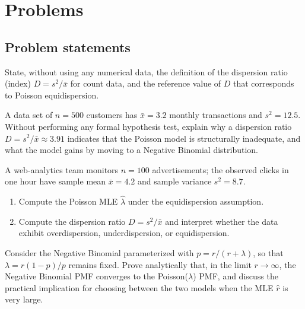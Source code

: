 \section*{Problems}

\subsection*{Problem statements}

\begin{problema}
	\label{prob:9b48fd0}
	State, without using any numerical data, the definition of the dispersion ratio (index) $D = s^2/\bar{x}$ for count data, and the reference value of $D$ that corresponds to Poisson equidispersion.
\end{problema}

\begin{problema}
	\label{prob:65ac238}
	A data set of $n=500$ customers has $\bar{x}=3.2$ monthly transactions and $s^2=12.5$. Without performing any formal hypothesis test, explain why a dispersion ratio $D=s^2/\bar{x}\approx3.91$ indicates that the Poisson model is structurally inadequate, and what the model gains by moving to a Negative Binomial distribution.
\end{problema}

\begin{problema}
	\label{prob:486b84f}
	A web-analytics team monitors $n=100$ advertisements; the observed clicks in one hour have sample mean $\bar{x}=4.2$ and sample variance $s^2=8.7$.
	\begin{enumerate}
		\item Compute the Poisson MLE $\hat{\lambda}$ under the equidispersion assumption.
		\item Compute the dispersion ratio $D=s^2/\bar{x}$ and interpret whether the data exhibit overdispersion, underdispersion, or equidispersion.
	\end{enumerate}
\end{problema}

\begin{problema}
	\label{prob:8fd9d7f}
	Consider the Negative Binomial parameterized with $p=r/(r+\lambda)$, so that $\lambda=r(1-p)/p$ remains fixed. Prove analytically that, in the limit $r\to\infty$, the Negative Binomial PMF converges to the Poisson($\lambda$) PMF, and discuss the practical implication for choosing between the two models when the MLE $\hat{r}$ is very large.
\end{problema}

